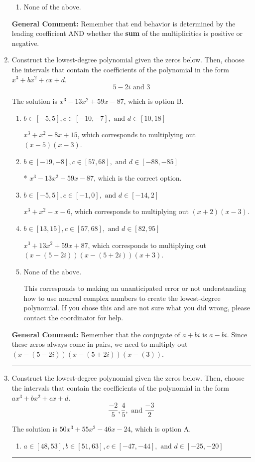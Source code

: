 \documentclass{extbook}[14pt]
\newcommand{\litem}[1]{\item #1

\rule{\textwidth}{0.4pt}}
\begin{document}
\begin{enumerate}
{\begin{enumerate}[label=\Alph*.]
\begin{multicols}{2}
\end{multicols}\item None of the above.\end{enumerate}
\textbf{General Comment:} Remember that end behavior is determined by the leading coefficient AND whether the \textbf{sum} of the multiplicities is positive or negative.
}
\litem{
Construct the lowest-degree polynomial given the zeros below. Then, choose the intervals that contain the coefficients of the polynomial in the form $x^3+bx^2+cx+d$.
\[ 5 - 2 i \text{ and } 3 \]

The solution is \( x^{3} -13 x^{2} +59 x -87 \), which is option B.\begin{enumerate}[label=\Alph*.]
\item \( b \in [-5, 5], c \in [-10, -7], \text{ and } d \in [10, 18] \)

$x^{3} + x^{2} -8 x + 15$, which corresponds to multiplying out $(x -5)(x -3)$.
\item \( b \in [-19, -8], c \in [57, 68], \text{ and } d \in [-88, -85] \)

* $x^{3} -13 x^{2} +59 x -87$, which is the correct option.
\item \( b \in [-5, 5], c \in [-1, 0], \text{ and } d \in [-14, 2] \)

$x^{3} + x^{2} -x -6$, which corresponds to multiplying out $(x + 2)(x -3)$.
\item \( b \in [13, 15], c \in [57, 68], \text{ and } d \in [82, 95] \)

$x^{3} +13 x^{2} +59 x + 87$, which corresponds to multiplying out $(x-(5 - 2 i))(x-(5 + 2 i))(x + 3)$.
\item \( \text{None of the above.} \)

This corresponds to making an unanticipated error or not understanding how to use nonreal complex numbers to create the lowest-degree polynomial. If you chose this and are not sure what you did wrong, please contact the coordinator for help.
\end{enumerate}

\textbf{General Comment:} Remember that the conjugate of $a+bi$ is $a-bi$. Since these zeros always come in pairs, we need to multiply out $(x-(5 - 2 i))(x-(5 + 2 i))(x-(3))$.
}
\litem{
Construct the lowest-degree polynomial given the zeros below. Then, choose the intervals that contain the coefficients of the polynomial in the form $ax^3+bx^2+cx+d$.
\[ \frac{-2}{5}, \frac{4}{5}, \text{ and } \frac{-3}{2} \]

The solution is \( 50x^{3} +55 x^{2} -46 x -24 \), which is option A.\begin{enumerate}[label=\Alph*.]
\item \( a \in [48, 53], b \in [51, 63], c \in [-47, -44], \text{ and } d \in [-25, -20] \)


\end{enumerate}}
\end{enumerate}
\end{document}
